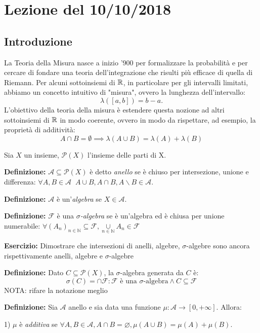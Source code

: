 \section{Lezione del 10/10/2018}
\subsection{Introduzione}
La Teoria della Misura nasce a inizio '900 per formalizzare la probabilità e per cercare di fondare una teoria dell'integrazione che risulti più efficace di quella di Riemann. Per alcuni sottoinsiemi di $\mathbb{R}$, in particolare per gli intervalli limitati, abbiamo un concetto intuitivo di "misura", ovvero la lunghezza dell'intervallo:
\[\lambda\left([a,b]\right) = b-a.\]
L'obiettivo della teoria della misura è estendere questa nozione ad altri sottoinsiemi di $\mathbb{R}$ in modo coerente, ovvero in modo da rispettare, ad esempio, la proprietà di additività:
\[A \cap B = \emptyset \implies \lambda(A\cup B) = \lambda(A) + \lambda(B)\]
\vspace{0.3cm}

Sia $X$ un insieme, $\mathscr{P}(X)$ l'insieme delle parti di X.

{\bf Definizione: } $\mathcal{A} \subseteq \mathscr{P}(X)$ è detto {\it anello} se è chiuso per intersezione, unione e differenza: $\forall A, B \in \mathcal A \; \; A\cup B, A\cap B, A\backslash B \in \mathcal{A}$.

{\bf Definizione: } $\mathcal{A}$ è un'{\it algebra} se $X\in \mathcal{A}$.

{\bf Definizione: } $\mathcal{F} $ è una {\it $\sigma$-algebra} se è un'algebra ed è chiusa per unione numerabile:
$\forall (A_n)_{n\in\mathbb{N}}\subseteq \mathcal{F}, \underset{n\in \mathbb{N}}{\cup} A_n \in \mathcal{F}$

{\bf Esercizio: } Dimostrare che intersezioni di anelli, algebre, $\sigma$-algebre sono ancora rispettivamente anelli, algebre e $\sigma$-algebre
\vspace{0.3cm}

{\bf Definizione: } Dato $C\subseteq \mathscr{P}(X)$, la $\sigma$-algebra generata da $C$ è:
$$\sigma(C)=\cap \mathcal{F}: \mathcal{F} \text{ è una } \sigma \text{-algebra} \wedge C\subseteq \mathcal{F} $$ 
{\color{red}NOTA: rifare la notazione meglio}

{\bf Definizione: } Sia $\mathcal{A}$ anello e sia data una funzione $\mu:\mathcal{A} \rightarrow[0,+\infty]$. Allora:

1) $\mu$ è {\it additiva} se $\forall A,B \in \mathcal{A}, A\cap B=\varnothing, \mu( A\cup B)=\mu(A)+\mu(B)$.
 
